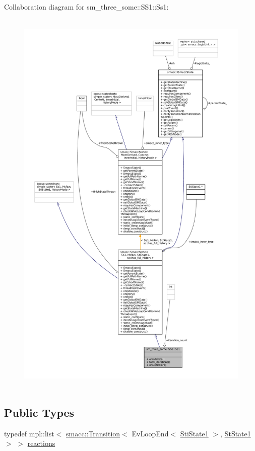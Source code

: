 Collaboration diagram for sm\+\_\+three\+\_\+some\+:\+:S\+S1\+:\+:Ss1\+:
\nopagebreak
\begin{figure}[H]
\begin{center}
\leavevmode
\includegraphics[height=550pt]{structsm__three__some_1_1SS1_1_1Ss1__coll__graph}
\end{center}
\end{figure}
\subsection*{Public Types}
\begin{DoxyCompactItemize}
\item 
typedef mpl\+::list$<$ \hyperlink{classsmacc_1_1Transition}{smacc\+::\+Transition}$<$ Ev\+Loop\+End$<$ \hyperlink{structsm__three__some_1_1ss1__states_1_1StiState1}{Sti\+State1} $>$, \hyperlink{structsm__three__some_1_1StState1}{St\+State1} $>$ $>$ \hyperlink{structsm__three__some_1_1SS1_1_1Ss1_af6da30e76698e6116ff26c725be5a4b3}{reactions}
\end{DoxyCompactItemize}
